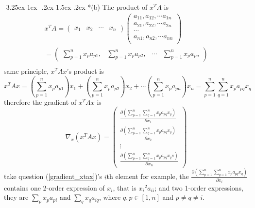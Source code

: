\documentclass[12pt]{article}
\makeatletter
\renewcommand\subsection{\@startsection{subsection}{2}{\z@}%
	{-3.25ex\@plus -1ex \@minus -.2ex}%
	{1.5ex \@plus .2ex}%
	{\normalfont\large\bfseries}}%
\makeatother
\begin{document}
	\subsection*{(b)}
	The product of $x^TA$ is
	\begin{equation}\label{xt_a}
	\begin{split}
	x^TA=
	\left( 
	\begin{array}{cccc}  
	x_1 &
	x_2 &
	\cdots &
	x_n 
	\end{array}
	\right)
	\left(  
	\begin{array}{c}  
	a_{11}, a_{12},\cdots a_{1n} \\
	a_{21}, a_{22},\cdots a_{2n} \\
	\cdots \\
	a_{n1}, a_{n2},\cdots a_{nn} \\
	\end{array}  
	\right)\\
	=
	\left( 
	\begin{array}{cccc} 
	\sum_{p=1}^n x_pa_{p1}, & \sum_{p=1}^n x_pa_{p2}, & \cdots & \sum_{p=1}^n x_pa_{pn} 
	\end{array}  
	\right)\\
	\end{split}
	\end{equation}
	same principle, $x^TAx$'s product is
	\begin{equation}\label{xt_a_x}
	x^TAx = (\sum_{p=1}^n x_pa_{p1})x_1 + (\sum_{p=1}^n x_pa_{p2})x_2 + \cdots (\sum_{p=1}^n x_pa_{pn})x_n
	= \sum_{p=1}^n \sum_{q=1}^n x_pa_{pq}x_q
	\end{equation}
	therefore the gradient of $x^TAx$ is
	\begin{equation}\label{gradient_xtax}
	\nabla_x(x^TAx)=
	\left(  
	\begin{array}{c}  
	\frac{\partial(\sum_{p=1}^n \sum_{q=1}^n x_pa_{pq}x_q)}{\partial x_1} \\
	\frac{\partial(\sum_{p=1}^n \sum_{q=1}^n x_pa_{pq}x_q)}{\partial x_2} \\
	\vdots \\
	\frac{\partial(\sum_{p=1}^n \sum_{q=1}^n x_pa_{pq}x_qs)}{\partial x_n} 
	\end{array}
	\right)
	\end{equation}
	take question (\ref{gradient_xtax})'s $i$th element for example, the $\frac{\partial(\sum_{p=1}^n \sum_{q=1}^n x_pa_{pq}x_q)}{\partial x_i}$ contains one 2-order expression of $x_i$, that is ${x_i}^2a_{ii}$; and two 1-order expressions, they are $\sum_{p} x_pa_{pi}$ and $\sum_{q} x_qa_{iq}$, where $q, p \in [1, n]$ and $p\neq q\neq i$.
\end{document}
